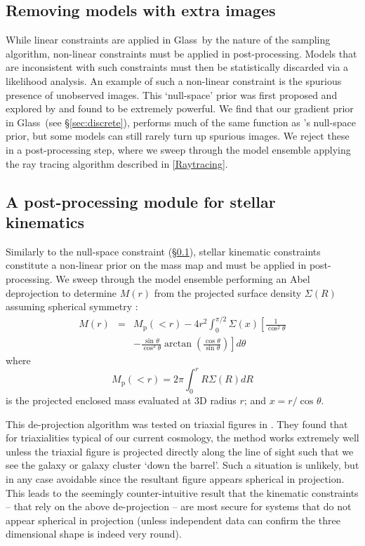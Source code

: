 \documentclass[galley,usenatbib]{mn2e}
\newcommand{\Glass}{{\sc Glass}}
\newcommand{\Mddd}{\ensuremath{M}}
\newcommand{\secref}[1] {\S\ref{#1}}
\newcommand{\cth}[1][]{\cos^{#1}\theta}
\newcommand{\sth}[1][]{\sin^{#1}\theta}
\def\dth{d\theta}
\begin{document}
\subsection{Removing models with extra images}\label{sec:glassextraimages} 
While linear constraints are applied in \Glass\ by the nature of the sampling
algorithm, non-linear constraints must be applied in post-processing. Models
that are inconsistent with such constraints must then be statistically
discarded via a likelihood analysis. An example of such a non-linear constraint
is the spurious presence of unobserved images. This `null-space' prior was
first proposed and explored by \citet{2006MNRAS.367.1209L} and found to be
extremely powerful. We find that our gradient prior in \Glass\ (see
\secref{sec:discrete}), performs much of the same function as
\citeauthor{2006MNRAS.367.1209L}'s null-space prior, but some models can still
rarely turn up spurious images. We reject these in a post-processing step,
where we sweep through the model ensemble applying the ray tracing algorithm
described in \ref{Raytracing}.

\subsection{A post-processing module for stellar kinematics}\label{sec:glasskinematics} 
Similarly to the null-space constraint (\secref{sec:glassextraimages}), stellar
kinematic constraints constitute a non-linear prior on the mass map and must be
applied in post-processing. We sweep through the model ensemble performing an
Abel deprojection to determine $\Mddd(r)$ from the projected surface density
$\Sigma(R)$ assuming spherical symmetry
\citep[e.g.][]{2008gady.book.....B,2008MNRAS.390.1647B}: 
%
\begin{eqnarray} 
    \Mddd(r) & = & M_\mathrm{p}(<r) - 4r^2 \int_0^{\pi/2} \Sigma\left(x\right) \left[\frac{1}{\cth[2]} \right. \nonumber \\ 
    & & \left. - \frac{\sth}{\cth[3]} \arctan\left(\frac{\cth}{\sth}\right) \right] \dth
\end{eqnarray}
%
where 
%
\begin{equation}
    M_\mathrm{p}(<r) = 2\pi \int_0^r R \Sigma(R) dR
\end{equation}
%
is the projected enclosed mass evaluated at 3D radius $r$; and $x = r/\cth$. 

This de-projection algorithm was tested on triaxial figures in
\citet{2006ApJ...652L...5S}. They found that for triaxialities typical of our
current cosmology, the method works extremely well unless the triaxial figure
is projected directly along the line of sight such that we see the galaxy or
galaxy cluster `down the barrel'. Such a situation is unlikely, but in any case
avoidable since the resultant figure appears spherical in projection. This
leads to the seemingly counter-intuitive result that the kinematic constraints
-- that rely on the above de-projection -- are most secure for systems that do
not appear spherical in projection (unless independent data can confirm the
three dimensional shape is indeed very round). 
\end{document}
